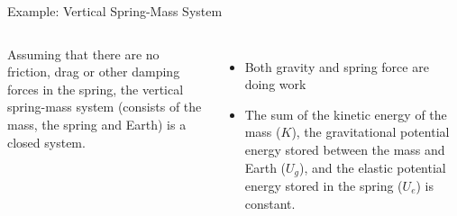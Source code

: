 \documentclass[12pt,compress,aspectratio=169]{beamer}
\begin{document}
\begin{frame}{Example: Vertical Spring-Mass System}
  \begin{columns}
    \centering

    Assuming that there are no friction, drag or other damping forces in the
    spring, the vertical spring-mass system (consists of the mass, the spring
    and Earth) is a closed system.
    \begin{itemize}
    \item Both gravity and spring force are doing work
    \item The sum of the kinetic energy of the mass ($K$), the gravitational
      potential energy stored between the mass and Earth ($U_g$), and the
      elastic potential energy stored in the spring ($U_e$) is constant.

    \end{itemize}
  \end{columns}
\end{frame}
\end{document}
